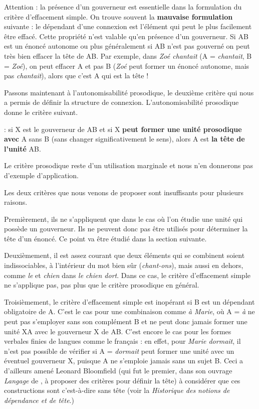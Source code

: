Attention : la présence d’un gouverneur est essentielle dans la formulation du  critère d’effacement simple. On trouve souvent la \textbf{mauvaise formulation} suivante : le dépendant d’une connexion est l’élément qui peut le plus facilement être effacé. Cette propriété n’est valable qu’en présence d’un gouverneur. Si AB est un énoncé autonome ou plus généralement si AB n’est pas gouverné on peut très bien effacer la tête de AB. Par exemple, dans \textit{Zoé chantait} (A = \textit{chantait}, B = \textit{Zoé}), on peut effacer A et pas B (\textit{Zoé} peut former un énoncé autonome, mais pas \textit{chantait}), alors que c’est A qui est la tête !

Passons maintenant à l’autonomisabilité prosodique, le deuxième critère qui nous a permis de définir la structure de connexion. L’autonomisabilité prosodique donne le critère suivant.

{: si X est le gouverneur de AB et si X \textbf{peut former une unité prosodique avec} A sans B (sans changer significativement le sens), alors A est \textbf{la tête de l’unité} AB.}

Le critère prosodique reste d'un utilisation marginale et nous n'en donnerons pas d'exemple d'application.

Les deux critères que nous venons de proposer sont insuffisants pour plusieurs raisons.

Premièrement, ils ne s’appliquent que dans le cas où l’on étudie une unité qui possède un gouverneur. Ils ne peuvent donc pas être utilisés pour déterminer la tête d’un énoncé. Ce point va être étudié dans la section suivante.

Deuxièmement, il est assez courant que deux éléments qui se combinent soient indissociables, à l’intérieur du mot bien sûr (\textit{chant-ons}), mais aussi en dehors, comme \textit{le} et \textit{chien} dans \textit{le chien dort}. Dans ce cas, le critère d’effacement simple ne s’applique pas, pas plus que le critère prosodique en général.

Troisièmement, le critère d’effacement simple est inopérant si B est un dépendant obligatoire de A. C’est le cas pour une combinaison comme \textit{à Marie}, où A = \textit{à} ne peut pas s’employer sans son complément B et ne peut donc jamais former une unité XA avec le gouverneur X de AB. C’est encore le cas pour les formes verbales finies de langues comme le français : en effet, pour \textit{Marie dormait}, il n’est pas possible de vérifier si A = \textit{dormait} peut former une unité avec un éventuel gouverneur X, puisque A ne s’emploie jamais sans un sujet B. Ceci a d’ailleurs amené Leonard Bloomfield (qui fut le premier, dans son ouvrage \textit{Langage} de \citeyear{bloomfield1933language}, à proposer des critères pour définir la tête) à considérer que ces constructions sont  c’est-à-dire sans tête (voir la  \textit{Historique des notions de dépendance et de tête}.)


